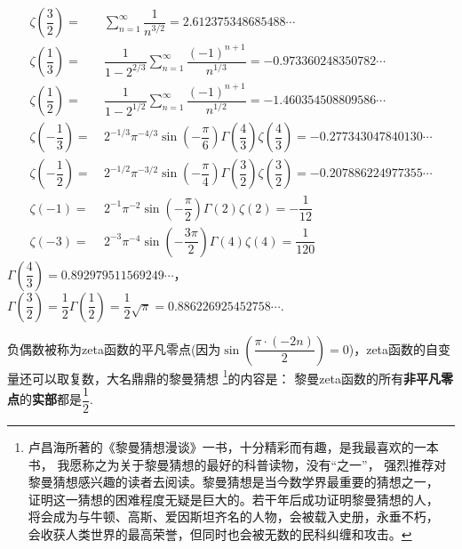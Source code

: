 \begin{itemize}[leftmargin=\inteval{\myitemleftmargin}pt,itemsep=
   \inteval{\myitemitempsep}pt,topsep=\inteval{\myitemtopsep}pt]
\begin{align*}
    \zeta\left(\dfrac{3}{2}\right)=&\ \sum_{n=1}^{\infty} \dfrac{1}{n^{3/2}}=
    2.612375348685488 \cdots\\
    \zeta\left(\dfrac{1}{3}\right)=&\ \dfrac{1}{1-2^{2/3}}\sum_{n=1}^{\infty}
    \dfrac{(-1)^{n+1}}{n^{1/3}}=-0.973360248350782\cdots \\
    \zeta\left(\dfrac{1}{2}\right)=&\ \dfrac{1}{1-2^{1/2}}\sum_{n=1}^{\infty}
    \dfrac{(-1)^{n+1}}{n^{1/2}}=-1.460354508809586\cdots \\
    \zeta\left(-\dfrac{1}{3}\right)=&\ 2^{-1/3}\pi^{-4/3}\sin\left(-\dfrac{\pi}{6}\right)
    \Gamma\left(\dfrac{4}{3}\right)\zeta\left(\dfrac{4}{3}\right)
    =-0.277343047840130\cdots  \\
    \zeta\left(-\dfrac{1}{2}\right)=&\ 2^{-1/2}\pi^{-3/2}\sin\left(-\dfrac{\pi}{4}\right)
    \Gamma\left(\dfrac{3}{2}\right)\zeta\left(\dfrac{3}{2}\right)
    = -0.207886224977355\cdots  \\
    \zeta\left(-1\right)=&\ 2^{-1}\pi^{-2}\sin\left(-\dfrac{\pi}{2}
    \right)\Gamma\left(2\right)\zeta\left(2\right)=-\dfrac{1}{12} \\
    \zeta\left(-3\right)=&\ 2^{-3}\pi^{-4}\sin\left(-\dfrac{3\pi}{2}
    \right)\Gamma\left(4\right)\zeta\left(4\right)=\dfrac{1}{120}    
\end{align*}
 $ \Gamma\left(\dfrac{4}{3}\right)= 0.892979511569249\cdots $，
$ \Gamma\left(\dfrac{3}{2}\right)=\dfrac{1}{2}\Gamma\left(\dfrac{1}{2}\right)
=\dfrac{1}{2}\sqrt{\pi}=0.886226925452758\cdots $.

负偶数被称为zeta函数的平凡零点(因为$ \sin\left(\dfrac{\pi\cdot 
  (-2n)}{2}\right)=0 $)，zeta函数的自变量还可以取复数，大名鼎鼎的黎曼猜想
\footnote{ 卢昌海所著的《黎曼猜想漫谈》一书，十分精彩而有趣，是我最喜欢的一本书，
    我愿称之为关于黎曼猜想的最好的科普读物，没有“之一”，
    强烈推荐对黎曼猜想感兴趣的读者去阅读。黎曼猜想是当今数学界最重要的猜想之一，
    证明这一猜想的困难程度无疑是巨大的。若干年后成功证明黎曼猜想的人，
    将会成为与牛顿、高斯、爱因斯坦齐名的人物，会被载入史册，永垂不朽，
    会收获人类世界的最高荣誉，但同时也会被无数的民科纠缠和攻击。}的内容是：
黎曼zeta函数的所有\textbf{非平凡零点}的\textbf{实部}都是$ \dfrac{1}{2} $. 


\end{itemize}
